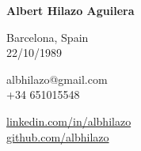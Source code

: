 \noindent
\textbf{\LARGE Albert Hilazo Aguilera}
\medskip

\begin{multicols}{3}
\noindent
Barcelona, Spain \\
22/10/1989

\noindent
albhilazo@gmail.com \\
+34 651015548

\noindent
\url{linkedin.com/in/albhilazo} \\
\url{github.com/albhilazo}
\end{multicols}

